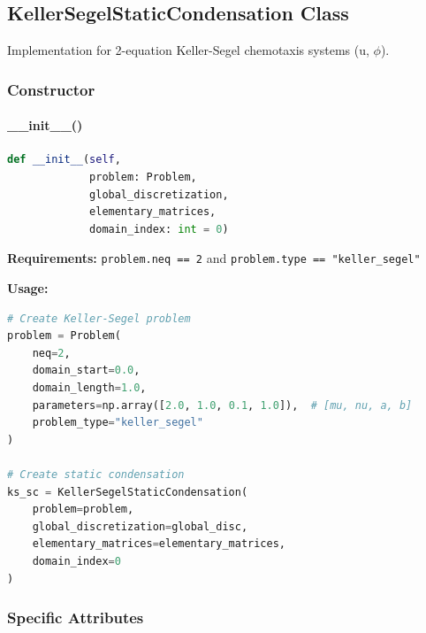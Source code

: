 \subsection{KellerSegelStaticCondensation Class}
\label{subsec:keller_segel_static_condensation}

Implementation for 2-equation Keller-Segel chemotaxis systems (u, $\phi$).

\subsubsection{Constructor}

\paragraph{\_\_init\_\_()}\leavevmode
\begin{lstlisting}[language=Python, caption=KellerSegel Constructor]
def __init__(self, 
             problem: Problem, 
             global_discretization, 
             elementary_matrices, 
             domain_index: int = 0)
\end{lstlisting}

\textbf{Requirements:} \texttt{problem.neq == 2} and \texttt{problem.type == "keller\_segel"}

\textbf{Usage:}
\begin{lstlisting}[language=Python, caption=KellerSegel Constructor Usage]
# Create Keller-Segel problem
problem = Problem(
    neq=2,
    domain_start=0.0,
    domain_length=1.0,
    parameters=np.array([2.0, 1.0, 0.1, 1.0]),  # [mu, nu, a, b]
    problem_type="keller_segel"
)

# Create static condensation
ks_sc = KellerSegelStaticCondensation(
    problem=problem,
    global_discretization=global_disc,
    elementary_matrices=elementary_matrices,
    domain_index=0
)
\end{lstlisting}

\subsubsection{Specific Attributes}

